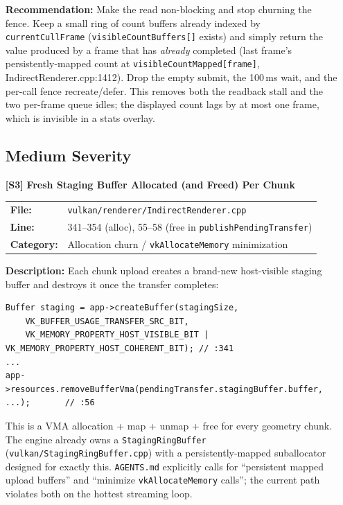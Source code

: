 \documentclass[a4paper,12pt]{article}
\newcommand{\severitybox}[2]{%
  \colorbox{#1}{\makebox[2.5cm][c]{\textcolor{white}{\textbf{#2}}}}%
}
\begin{document}
\begin{enumerate}[leftmargin=*]
  \textbf{Recommendation:}
  Make the read non-blocking and stop churning the fence. Keep a small
  ring of count buffers already indexed by \texttt{currentCullFrame}
  (\texttt{visibleCountBuffers[]} exists) and simply return the value produced
  by a frame that has \emph{already} completed (last frame's persistently-mapped
  count at \texttt{visibleCountMapped[frame]}, IndirectRenderer.cpp:1412). Drop
  the empty submit, the 100\,ms wait, and the per-call fence recreate/defer.
  This removes both the readback stall and the two per-frame queue idles; the
  displayed count lags by at most one frame, which is invisible in a stats
  overlay.

\subsection{Medium Severity}

\item[\textbf{[S3]}] \textbf{Fresh Staging Buffer Allocated (and Freed) Per Chunk}
  \hfill \severitybox{mediumcolor}{MEDIUM}

  \begin{tabular}{ll}
    \textbf{File:} & \texttt{vulkan/renderer/IndirectRenderer.cpp} \\
    \textbf{Line:} & 341--354 (alloc), 55--58 (free in \texttt{publishPendingTransfer}) \\
    \textbf{Category:} & Allocation churn / \texttt{vkAllocateMemory} minimization \\
  \end{tabular}

  \textbf{Description:}
  Each chunk upload creates a brand-new host-visible staging buffer and destroys
  it once the transfer completes:

\begin{lstlisting}
Buffer staging = app->createBuffer(stagingSize,
    VK_BUFFER_USAGE_TRANSFER_SRC_BIT,
    VK_MEMORY_PROPERTY_HOST_VISIBLE_BIT | VK_MEMORY_PROPERTY_HOST_COHERENT_BIT); // :341
...
app->resources.removeBufferVma(pendingTransfer.stagingBuffer.buffer, ...);       // :56
\end{lstlisting}

  This is a VMA allocation + map + unmap + free for every geometry chunk. The
  engine already owns a \texttt{StagingRingBuffer}
  (\texttt{vulkan/StagingRingBuffer.cpp}) with a persistently-mapped suballocator
  designed for exactly this. \texttt{AGENTS.md} explicitly calls for
  ``persistent mapped upload buffers'' and ``minimize \texttt{vkAllocateMemory}
  calls''; the current path violates both on the hottest streaming loop.


\end{enumerate}
\end{document}
